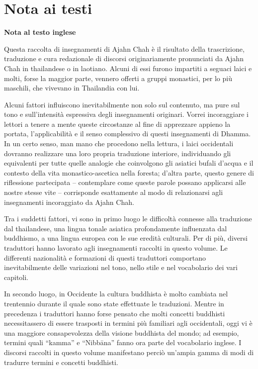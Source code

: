 \chapter{Nota ai testi}

\textbf{Nota al testo inglese}

Questa raccolta di insegnamenti di Ajahn Chah è il risultato della
trascrizione, traduzione e cura redazionale di discorsi originariamente
pronunciati da Ajahn Chah in thailandese o in laotiano. Alcuni di essi
furono impartiti a seguaci laici e molti, forse la maggior parte,
vennero offerti a gruppi monastici, per lo più maschili, che vivevano in
Thailandia con lui.

Alcuni fattori influiscono inevitabilmente non solo sul contenuto, ma
pure sul tono e sull'intensità espressiva degli insegnamenti originari.
Vorrei incoraggiare i lettori a tenere a mente queste circostanze al
fine di apprezzare appieno la portata, l'applicabilità e il senso
complessivo di questi insegnamenti di Dhamma. In un certo senso, man
mano che procedono nella lettura, i laici occidentali dovranno
realizzare una loro propria traduzione interiore, individuando gli
equivalenti per tutte quelle analogie che coinvolgono gli asiatici
bufali d'acqua e il contesto della vita monastico-ascetica nella
foresta; d'altra parte, questo genere di riflessione partecipata --
contemplare come queste parole possano applicarsi alle nostre stesse
vite -- corrisponde esattamente al modo di relazionarsi agli
insegnamenti incoraggiato da Ajahn Chah.

Tra i suddetti fattori, vi sono in primo luogo le difficoltà connesse
alla traduzione dal thailandese, una lingua tonale asiatica
profondamente influenzata dal buddhismo, a una lingua europea con le sue
eredità culturali. Per di più, diversi traduttori hanno lavorato agli
insegnamenti raccolti in questo volume. Le differenti nazionalità e
formazioni di questi traduttori comportano inevitabilmente delle
variazioni nel tono, nello stile e nel vocabolario dei vari capitoli.

In secondo luogo, in Occidente la cultura buddhista è molto cambiata nel
trentennio durante il quale sono state effettuate le traduzioni. Mentre
in precedenza i traduttori hanno forse pensato che molti concetti
buddhisti necessitassero di essere trasposti in termini più familiari
agli occidentali, oggi vi è una maggiore consapevolezza della visione
buddhista del mondo; ad esempio, termini quali ``kamma'' e ``Nibbāna''
fanno ora parte del vocabolario inglese. I discorsi raccolti in questo
volume manifestano perciò un'ampia gamma di modi di tradurre termini e
concetti buddhisti.

